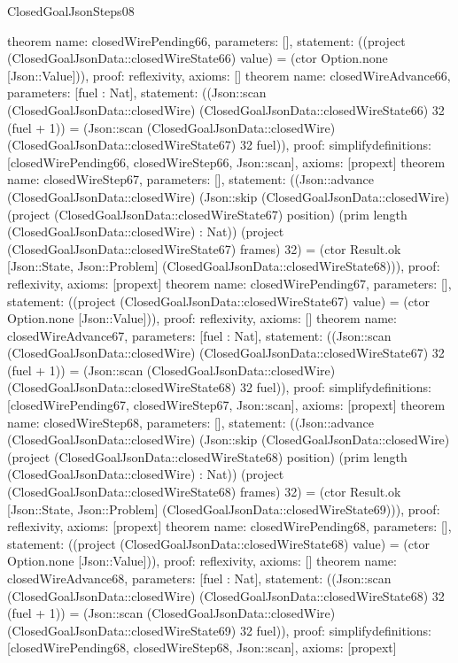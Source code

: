 \begin{lexlean}{ClosedGoalJsonSteps08}
\begin{semanticmodule}
{}
theorem{
 name: closedWirePending66, parameters: [],
 statement: ((project (ClosedGoalJsonData::closedWireState66) value) = (ctor Option.none [Json::Value])), proof: reflexivity{}, axioms: []
}
theorem{
 name: closedWireAdvance66, parameters: [fuel : Nat],
 statement: ((Json::scan (ClosedGoalJsonData::closedWire) (ClosedGoalJsonData::closedWireState66) 32 (fuel + 1)) = (Json::scan (ClosedGoalJsonData::closedWire) (ClosedGoalJsonData::closedWireState67) 32 fuel)), proof: simplify{definitions: [closedWirePending66, closedWireStep66, Json::scan]}, axioms: [propext]
}
theorem{
 name: closedWireStep67, parameters: [],
 statement: ((Json::advance (ClosedGoalJsonData::closedWire) (Json::skip (ClosedGoalJsonData::closedWire) (project (ClosedGoalJsonData::closedWireState67) position) (prim length (ClosedGoalJsonData::closedWire) : Nat)) (project (ClosedGoalJsonData::closedWireState67) frames) 32) = (ctor Result.ok [Json::State, Json::Problem] (ClosedGoalJsonData::closedWireState68))), proof: reflexivity{}, axioms: [propext]
}
theorem{
 name: closedWirePending67, parameters: [],
 statement: ((project (ClosedGoalJsonData::closedWireState67) value) = (ctor Option.none [Json::Value])), proof: reflexivity{}, axioms: []
}
theorem{
 name: closedWireAdvance67, parameters: [fuel : Nat],
 statement: ((Json::scan (ClosedGoalJsonData::closedWire) (ClosedGoalJsonData::closedWireState67) 32 (fuel + 1)) = (Json::scan (ClosedGoalJsonData::closedWire) (ClosedGoalJsonData::closedWireState68) 32 fuel)), proof: simplify{definitions: [closedWirePending67, closedWireStep67, Json::scan]}, axioms: [propext]
}
theorem{
 name: closedWireStep68, parameters: [],
 statement: ((Json::advance (ClosedGoalJsonData::closedWire) (Json::skip (ClosedGoalJsonData::closedWire) (project (ClosedGoalJsonData::closedWireState68) position) (prim length (ClosedGoalJsonData::closedWire) : Nat)) (project (ClosedGoalJsonData::closedWireState68) frames) 32) = (ctor Result.ok [Json::State, Json::Problem] (ClosedGoalJsonData::closedWireState69))), proof: reflexivity{}, axioms: [propext]
}
theorem{
 name: closedWirePending68, parameters: [],
 statement: ((project (ClosedGoalJsonData::closedWireState68) value) = (ctor Option.none [Json::Value])), proof: reflexivity{}, axioms: []
}
theorem{
 name: closedWireAdvance68, parameters: [fuel : Nat],
 statement: ((Json::scan (ClosedGoalJsonData::closedWire) (ClosedGoalJsonData::closedWireState68) 32 (fuel + 1)) = (Json::scan (ClosedGoalJsonData::closedWire) (ClosedGoalJsonData::closedWireState69) 32 fuel)), proof: simplify{definitions: [closedWirePending68, closedWireStep68, Json::scan]}, axioms: [propext]
}
\end{semanticmodule}
\end{lexlean}
